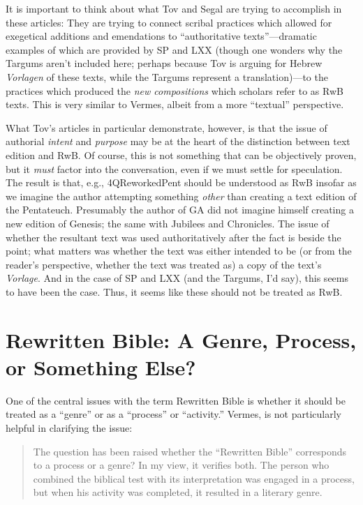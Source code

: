 It is important to think about what Tov and Segal are trying to
accomplish in these articles: They are trying to connect scribal
practices which allowed for exegetical additions and emendations to
``authoritative texts''---dramatic examples of which are provided by SP
and LXX (though one wonders why the Targums aren't included here;
perhaps because Tov is arguing for Hebrew \emph{Vorlagen} of these
texts, while the Targums represent a translation)---to the practices
which produced the \emph{new compositions} which scholars refer to as
RwB texts. This is very similar to Vermes, albeit from a more
``textual'' perspective.

What Tov's articles in particular demonstrate, however, is that the
issue of authorial \emph{intent} and \emph{purpose} may be at the heart
of the distinction between text edition and RwB. Of course, this is not
something that can be objectively proven, but it \emph{must} factor into
the conversation, even if we must settle for speculation. The result is
that, e.g., 4QReworkedPent should be understood as RwB insofar as we
imagine the author attempting something \emph{other} than creating a
text edition of the Pentateuch. Presumably the author of GA did not
imagine himself creating a new edition of Genesis; the same with
Jubilees and Chronicles. The issue of whether the resultant text was
used authoritatively after the fact is beside the point; what matters
was whether the text was either intended to be (or from the reader's
perspective, whether the text was treated as) a copy of the text's
\emph{Vorlage}. And in the case of SP and LXX (and the Targums, I'd
say), this seems to have been the case. Thus, it seems like these should
not be treated as RwB.

\hypertarget{rwb-a-genre-process-or-something-else}{%
\section{Rewritten Bible: A Genre, Process, or Something
Else?}\label{rwb-a-genre-process-or-something-else}}

One of the central issues with the term Rewritten Bible is whether it
should be treated as a ``genre'' or as a ``process'' or ``activity.''
Vermes, is not particularly helpful in clarifying the issue:

\begin{quote}
The question has been raised whether the ``Rewritten Bible'' corresponds
to a process or a genre? In my view, it verifies both. The person who
combined the biblical test with its interpretation was engaged in a
process, but when his activity was completed, it resulted in a literary
genre.\autocite[8]{vermes_zsengeller2014}
\end{quote}

